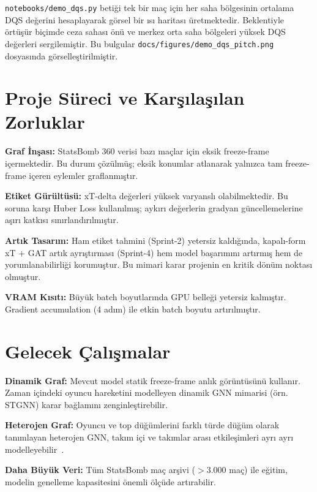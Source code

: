 \documentclass[conference]{IEEEtran}
\begin{document}
\texttt{notebooks/demo\_dqs.py} betiği tek bir maç için her saha bölgesinin ortalama
DQS değerini hesaplayarak görsel bir ısı haritası üretmektedir. Beklentiyle örtüşür
biçimde ceza sahası önü ve merkez orta saha bölgeleri yüksek DQS değerleri
sergilemiştir. Bu bulgular \texttt{docs/figures/demo\_dqs\_pitch.png} dosyasında
görselleştirilmiştir.

\section{Proje Süreci ve Karşılaşılan Zorluklar}

\textbf{Graf İnşası:} StatsBomb 360 verisi bazı maçlar için eksik freeze-frame içermektedir.
Bu durum çözülmüş; eksik konumlar atlanarak yalnızca tam freeze-frame içeren eylemler
graflanmıştır.

\textbf{Etiket Gürültüsü:} xT-delta değerleri yüksek varyanslı olabilmektedir. Bu
soruna karşı Huber Loss kullanılmış; aykırı değerlerin gradyan güncellemelerine
aşırı katkısı sınırlandırılmıştır.

\textbf{Artık Tasarım:} Ham etiket tahmini (Sprint-2) yetersiz kaldığında, kapalı-form
xT + GAT artık ayrıştırması (Sprint-4) hem model başarımını artırmış hem de
yorumlanabilirliği korumuştur. Bu mimari karar projenin en kritik dönüm noktası
olmuştur.

\textbf{VRAM Kısıtı:} Büyük batch boyutlarında GPU belleği yetersiz kalmıştır.
Gradient accumulation (4 adım) ile etkin batch boyutu artırılmıştır.

\section{Gelecek Çalışmalar}

\textbf{Dinamik Graf:} Mevcut model statik freeze-frame anlık görüntüsünü kullanır.
Zaman içindeki oyuncu hareketini modelleyen dinamik GNN mimarisi (örn. STGNN)
karar bağlamını zenginleştirebilir.

\textbf{Heterojen Graf:} Oyuncu ve top düğümlerini farklı türde düğüm olarak
tanımlayan heterojen GNN, takım içi ve takımlar arası etkileşimleri ayrı ayrı
modelleyebilir~\cite{hamilton2020graph}.

\textbf{Daha Büyük Veri:} Tüm StatsBomb maç arşivi ($>$3.000 maç) ile eğitim,
modelin genelleme kapasitesini önemli ölçüde artırabilir.
\end{document}
